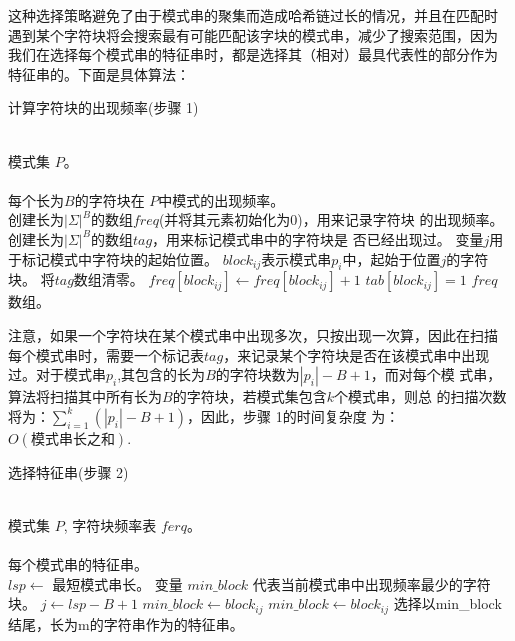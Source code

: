 这种选择策略避免了由于模式串的聚集而造成哈希链过长的情况，并且在匹配时
遇到某个字符块将会搜索最有可能匹配该字块的模式串，减少了搜索范围，因为
我们在选择每个模式串的特征串时，都是选择其（相对）最具代表性的部分作为
特征串的。下面是具体算法：

\begin{algorithm}
  \caption{计算字符块的出现频率(步骤 1)}
  \label{alg:block_freq}
  \begin{algorithmic}[1]
    \REQUIRE ~~\\
    模式集 $P$。 \\
    \ENSURE ~~\\
    每个长为$B$的字符块在 $P$中模式的出现频率。\\
    \STATE
    \STATE 创建长为$|\Sigma|^B$的数组$freq$(并将其元素初始化为0)，用来记录字符块
    的出现频率。
    \STATE 创建长为$|\Sigma|^B$的数组$tag$，用来标记模式串中的字符块是
    否已经出现过。
    \STATE 变量$j$用于标记模式中字符块的起始位置。
    \STATE $block_{ij}$表示模式串$p_i$中，起始于位置$j$的字符块。
    \STATE 将$tag$数组清零。
    \STATE $freq[block_{ij}] \leftarrow freq[block_{ij}]+1$
    \STATE $tab[block_{ij}]=1$
    \ENDIF
    \ENDFOR
    \ENDFOR
    \STATE
    \RETURN $freq$ 数组。
  \end{algorithmic}
\end{algorithm}


注意，如果一个字符块在某个模式串中出现多次，只按出现一次算，因此在扫描
每个模式串时，需要一个标记表$tag$，来记录某个字符块是否在该模式串中出现
过。对于模式串$p_i$,其包含的长为$B$的字符块数为$|p_i|-B+1$，而对每个模
式串，算法将扫描其中所有长为$B$的字符块，若模式集包含$k$个模式串，则总
的扫描次数将为：$\sum_{i=1}^{k}(|p_i|-B+1)$，因此，步骤 1的时间复杂度
为：$O(模式串长之和)$.

\begin{algorithm}
  \caption{选择特征串(步骤 2)}
  \label{alg:choose_signature}
  \begin{algorithmic}[1]
    \REQUIRE ~~\\
    模式集 $P$, 字符块频率表 $ferq$。 \\
    \ENSURE ~~\\
    每个模式串的特征串。\\
    \STATE
    \STATE $lsp \leftarrow$ 最短模式串长。
    \STATE 变量 $min\_block$ 代表当前模式串中出现频率最少的字符块。
    \STATE 
    \STATE $j \leftarrow lsp-B+1$
    \STATE $min\_block \leftarrow block_{ij}$
    \STATE $min\_block \leftarrow block_{ij}$
    \STATE 选择以min\_block结尾，长为m的字符串作为的特征串。
    \ENDIF
    \ENDFOR
    \ENDFOR
  \end{algorithmic}
\end{algorithm}

